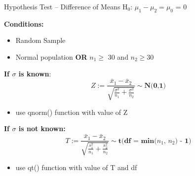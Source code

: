 \documentclass{beamer}
\begin{document}
\begin{frame}{Hypothesis Test -- Difference of Means}
H$_0$: $\mu_1 - \mu_2 = \mu_0$ = 0 \vspace{3mm}

\textbf{Conditions:}
\begin{itemize}
    \item Random Sample
    \item Normal population \textbf{OR} $n_1 \geq$ 30 and $n_2 \geq 30$
\end{itemize} \vspace{3mm}

\textbf{If $\sigma$ is known}:
\begin{equation*}
    Z := \frac{\bar{x}_1-\bar{x}_2}{\sqrt{\frac{\sigma^2}{n_1}+\frac{\sigma^2}{n_2}}} \sim \textbf{N(0,1)}
\end{equation*} \vspace{-4mm}
\begin{itemize}
    \item use qnorm() function with value of Z
\end{itemize} \vspace{2mm}

\textbf{If $\sigma$ is not known:}
\begin{equation*}
    T := \frac{\bar{x}_1-\bar{x}_2}{\sqrt{\frac{s_1^2}{n_1}+\frac{s_2^2}{n_2}}} \sim \textbf{t(df = min($n_1$, $n_2$) - 1)}
\end{equation*} \vspace{-4mm}
\begin{itemize}
    \item use qt() function with value of T and df
\end{itemize}
\end{frame}
\end{document}

